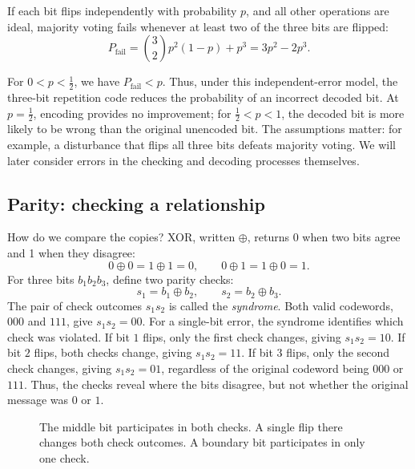 \documentclass[11pt,a4paper]{article}
\begin{document}
If each bit flips independently with probability \(p\), and all other operations are ideal, majority voting fails whenever at least two of the three bits are flipped:
\begin{equation}\label{eq:classical-failure}
P_{\mathrm{fail}}
= \binom{3}{2}p^2(1-p)+p^3
= 3p^2-2p^3 .
\end{equation}

For \(0<p<\tfrac12\), we have \(P_{\mathrm{fail}}<p\). Thus, under this independent-error model, the three-bit repetition code reduces the probability of an incorrect decoded bit. At \(p=\tfrac12\), encoding provides no improvement; for \(\tfrac12<p<1\), the decoded bit is more likely to be wrong than the original unencoded bit. The assumptions matter: for example, a disturbance that flips all three bits defeats majority voting. We will later consider errors in the checking and decoding processes themselves.

\subsection{Parity: checking a relationship}
How do we compare the copies? XOR, written $\oplus$, returns 0 when two bits agree and 1 when they disagree:
\[
0\oplus0=1\oplus1=0,\qquad 0\oplus1=1\oplus0=1.
\]
For three bits $b_1b_2b_3$, define two parity checks:
\begin{equation}\label{eq:classical-checks}
s_1=b_1\oplus b_2,\qquad s_2=b_2\oplus b_3.
\end{equation}
The pair of check outcomes $s_1s_2$ is called the \emph{syndrome}. Both valid codewords, $000$ and $111$, give $s_1s_2=00$.
For a single-bit error, the syndrome identifies which check was
violated. If bit \(1\) flips, only the first check changes, giving
\(s_1s_2=10\). If bit \(2\) flips, both checks change, giving
\(s_1s_2=11\). If bit \(3\) flips, only the second check changes,
giving \(s_1s_2=01\), regardless of the original codeword being \(000\) or \(111\). Thus, the checks reveal where the bits disagree, but not whether the original message was \(0\) or \(1\).

\begin{figure}[!ht]
\centering
{}
\caption{The middle bit participates in both checks. A single flip there changes both check outcomes. A boundary bit participates in only one check.}
\end{figure}
\end{document}
